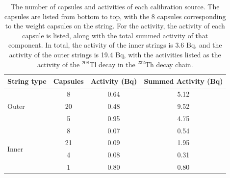 \begin{table}[htbp]
    \centering
    \caption[The number of capsules and activities of each calibration source]
    {The number of capsules and activities of each calibration source.
    The capsules are listed from bottom to top, with the 8 capsules corresponding to the weight capsules on the string.
    For the activity, the activity of each capsule is listed, along with the total summed activity of that component.
    In total, the activity of the inner strings is 3.6 Bq, and the activity of the outer strings is 19.4 Bq, with the activities listed as the activity of the $^{208}$Tl decay in the $^{232}$Th decay chain.}
    \label{tab:calibration_activities}
    \begin{tabular}{lccc}
    \hline 
    \hline
        String type & Capsules & Activity (Bq) & Summed Activity (Bq) \\
        \hline 
        \multirow{3}{*}{Outer} & 8 & 0.64 & 5.12 \\
        & 20 & 0.48 & 9.52 \\
        & 5 & 0.95 & 4.75 \\
        \hline
        \multirow{4}{*}{Inner} & 8 & 0.07 & 0.54 \\
        & 21 & 0.09 & 1.95 \\
        & 4 & 0.08 & 0.31 \\
        & 1 & 0.80 & 0.80 \\
        \hline
        \hline
    \end{tabular}
\end{table}

